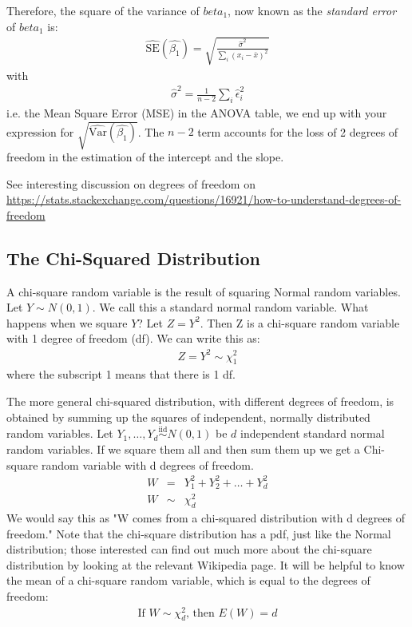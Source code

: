 \documentclass[11pt]{article}
\theoremstyle{remark}
\begin{document}
Therefore, the square of the variance of $beta_1$, now known as the \emph{standard error} of $beta_1$ is:
\begin{eqnarray}
\widehat{\text{SE}}(\hat{\beta_1})  = \sqrt{\frac{\hat{\sigma}^2}{\sum_i (x_i - \bar{x})^2}}
\end{eqnarray}
with
\begin{eqnarray}
\hat{\sigma}^2 = \frac{1}{n-2} \sum_i \hat{\epsilon}_i^2
\end{eqnarray}
i.e. the Mean Square Error (MSE) in the ANOVA table, we end up with your expression for $\sqrt{\widehat{\textrm{Var}}(\hat{\beta_1})}$. The $n-2$ term accounts for the loss of 2 degrees of freedom in the estimation of the intercept and the slope.


See interesting discussion on degrees of freedom on \url{https://stats.stackexchange.com/questions/16921/how-to-understand-degrees-of-freedom}


\pagebreak
\subsection{The Chi-Squared Distribution}\label{SectionChiSquare}
A chi-square random variable is the result of squaring Normal random variables.  Let $Y\sim N(0,1)$. We call this a standard normal random variable. What happens when we square $Y$?  Let $Z=Y^2$.  Then Z is a chi-square random variable with 1 degree of freedom (df).  We can write this as:
\begin{eqnarray}
Z=Y^2 \sim \chi_1^2
\end{eqnarray}
where the subscript 1 means that there is 1 df.

The more general chi-squared distribution, with different degrees of freedom, is obtained by summing up the squares of independent, normally distributed random variables.
Let $Y_1,\hdots,Y_d\overset{\mathrm{iid}}{\sim}N(0,1)$ be $d$ independent standard normal random variables. If we square them all and then sum them up we get a Chi-square random variable with d degrees of freedom.
\begin{eqnarray}
W&=&Y_1^2+Y_2^2+\hdots+Y_d^2\nonumber\\
W&\sim&\chi_d^2
\end{eqnarray}
We would say this as "W comes from a chi-squared distribution with d degrees of freedom."  Note that the chi-square distribution has a pdf, just like the Normal distribution; those interested can find out much more about the chi-square distribution by looking at the relevant Wikipedia page.  It will be helpful to know the mean of a chi-square random variable, which is equal to the degrees of freedom:
\begin{eqnarray}
\text{If $W\sim\chi_d^2$, then $E(W)=d$}
\end{eqnarray}
\end{document}
